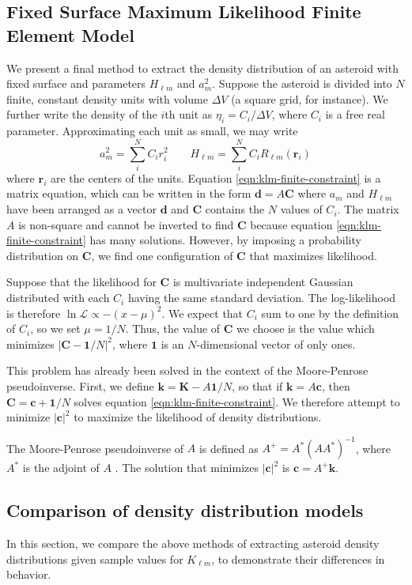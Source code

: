 \documentclass{aastex631}
\begin{document}
\subsection{Fixed Surface Maximum Likelihood Finite Element Model}
\label{sec:like-density}
We present a final method to extract the density distribution of an asteroid with fixed surface and parameters $H_{\ell m}$ and $a_m^2$. Suppose the asteroid is divided into $N$ finite, constant density units with volume $\Delta V$ (a square grid, for instance). We further write the density of the $i$th unit as $\eta_i = C_i / \Delta V$, where $C_i$ is a free real parameter. Approximating each unit as small, we may write 
\begin{equation}
  a_m^2 = \sum_i^N C_i r_i^2 \qquad H_{\ell m} = \sum_i^N C_i R_{\ell m}(\bm r_i)
  \label{eqn:klm-finite-constraint}
\end{equation}
where $\bm r_i$ are the centers of the units. Equation \ref{eqn:klm-finite-constraint} is a matrix equation, which can be written in the form $\bm d = A \bm C$ where $a_m$ and $H_{\ell m}$ have been arranged as a vector $\bm d$ and $\bm C$ contains the $N$ values of $C_i$. The matrix $A$ is non-square and cannot be inverted to find $\bm C$ because equation \ref{eqn:klm-finite-constraint} has many solutions. However, by imposing a probability distribution on $\bm C$, we find one configuration of $\bm C$ that maximizes likelihood.

Suppose that the likelihood for $\bm C$ is multivariate independent Gaussian distributed with each $C_i$ having the same standard deviation. The log-likelihood is therefore $\ln \mathcal{L} \propto -(x - \mu)^2$. We expect that $C_{i}$ sum to one by the definition of $C_i$, so we set $\mu = 1/N$. Thus, the value of $\bm C$ we choose is the value which minimizes $|\bm C - \bm 1 /N|^2$, where $\bm 1$ is an $N$-dimensional vector of only ones.

This problem has already been solved in the context of the Moore-Penrose pseudoinverse. First, we define $\bm k = \bm K - A\bm 1/N$, so that if $\bm k = A \bm c$, then $\bm C = \bm c + \bm 1/N$ solves equation \ref{eqn:klm-finite-constraint}. We therefore attempt to minimize $|\bm c|^2$ to maximize the likelihood of density distributions.

The Moore-Penrose pseudoinverse of $A$ is defined as $A^+ = A^* (AA^*)^{-1}$, where $A^*$ is the adjoint of $A$ \cite{Barata2012}. The solution that minimizes $|\bm c|^2$ is $\bm c = A^+\bm k$. 


\subsection{Comparison of density distribution models}
In this section, we compare the above methods of extracting asteroid density distributions given sample values for $K_{\ell m}$, to demonstrate their differences in behavior.
\end{document}
